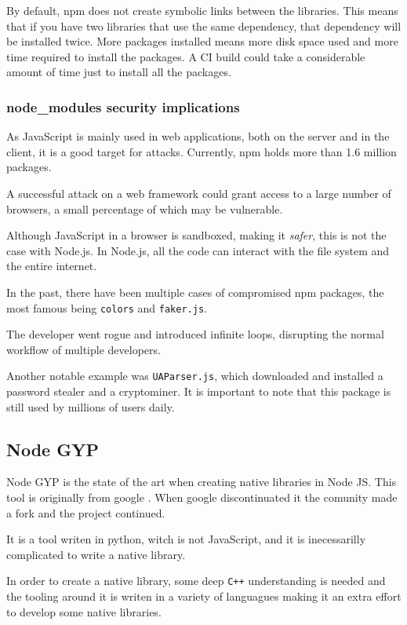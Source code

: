 \documentclass[12pt, letterpaper]{article}
\begin{document}
\begin{multicols}{2}
    By default, npm does not create symbolic links between the libraries. This means that if you have two libraries that use the same dependency, that dependency will be installed twice. More packages installed means more disk space used and more time required to install the packages. A CI build could take a considerable amount of time just to install all the packages.

    \subsubsection{node\_modules security implications}

    As JavaScript is mainly used in web applications, both on the server and in the client, it is a good target for attacks. Currently, npm holds more than 1.6 million packages. \cite{NPMCOUNT}

    A successful attack on a web framework could grant access to a large number of browsers, a small percentage of which may be vulnerable.

    Although JavaScript in a browser is sandboxed, making it \textit{safer}, this is not the case with Node.js. In Node.js, all the code can interact with the file system and the entire internet.

    In the past, there have been multiple cases of compromised npm packages, the most famous being \verb|colors| and \verb|faker.js|. \cite{BADFAKER} \cite{VERGEFAKER}

    The developer went rogue and introduced infinite loops, disrupting the normal workflow of multiple developers.

    Another notable example was \verb|UAParser.js|, which downloaded and installed a password stealer and a cryptominer. It is important to note that this package is still used by millions of users daily.


    \subsection{Node GYP}

    Node GYP is the state of the art when creating native libraries in Node JS. This tool is originally from google \cite{FKNODE}. When google discontinuated it the comunity made a fork and the project continued. \cite{NODEGYP}

    It is a tool writen in python, witch is not JavaScript, and it is inecessarilly complicated to write a native library.

    In order to create a native library, some deep \verb|C++| understanding is needed and the tooling around it is writen in a variety of languagues making it an extra effort to develop some native libraries.


\end{multicols}
\end{document}
